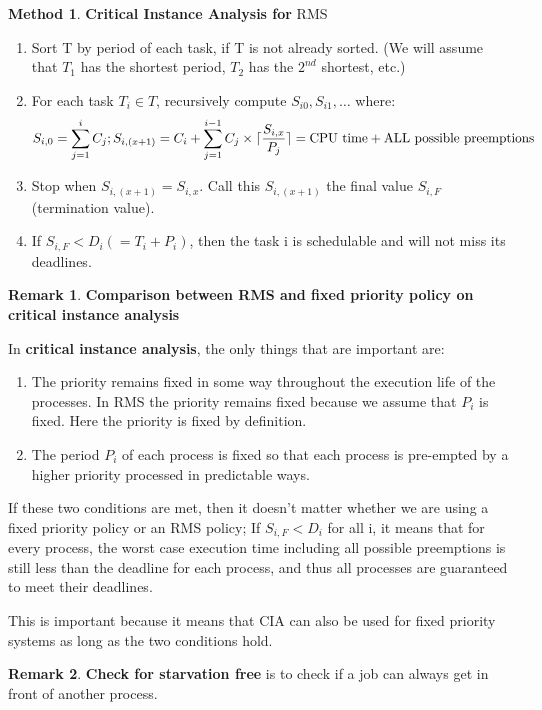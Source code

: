 \documentclass[11pt,a4paper]{article}
\theoremstyle{definition}
\newtheorem*{remark}{Remark}
\newtheorem{method}{Method}[section]
\DeclarePairedDelimiter\ceil{\lceil}{\rceil}
\newenvironment{myenumerate}
{ \begin{enumerate}
    \setlength{\itemsep}{5pt}
    \setlength{\parskip}{0pt}
    \setlength{\parsep}{0pt}     }
{ \end{enumerate}                }
\begin{document}
\begin{method}{\textbf{Critical Instance Analysis for} \textsf{RMS}}
	\begin{myenumerate}
		\item Sort T by period of each task, if T is not already sorted. (We will assume that $T_1$ has the shortest period, $T_2$ has the $2^{nd}$ shortest, etc.)
		\item For each task $T_i \in T$, recursively compute $S_{i0}, S_{i1}, \dots$ where:
		\[ S_{i,0}=\sum^i_{j=1}C_j; S_{i,(x+1)}=C_i+\sum^{i-1}_{j=1}C_j\times \ceil{\frac{S_{i,x}}{P_j}} =\text{CPU time}+\text{ALL possible preemptions} \]
		\item Stop when $S_{i,(x+1)}=S_{i,x}$. Call this $S_{i,(x+1)}$ the final value $S_{i,F}$ (termination value).
		\item If $S_{i,F}<D_i (=T_i+P_i)$, then the task i is schedulable and will not miss its deadlines.
	\end{myenumerate}
\end{method}
\begin{remark}{\textbf{Comparison between RMS and fixed priority policy on critical instance analysis}}

	In \textbf{critical instance analysis}, the only things that are important are:
	\begin{myenumerate}
		\item The priority remains fixed in some way throughout the execution life of the processes. In RMS the priority remains fixed because we assume that $P_i$ is fixed. Here the priority is fixed by definition.
		\item The period $P_i$ of each process is fixed so that each process is pre-empted by a higher priority processed in predictable ways.
	\end{myenumerate}
	
	If these two conditions are met, then it doesn’t matter whether we are using a fixed priority policy or an RMS policy; If $S_{i, F} < D_i$ for all i, it means that for every process, the worst case execution time including all possible preemptions is still less than the deadline for each process, and thus all processes are guaranteed to meet their deadlines.
	
	This is important because it means that CIA can also be used for fixed priority systems as long as the two conditions hold.
\end{remark}

\begin{remark}{\textbf{Check for starvation free}}
	is to check if a job can always get in front of another process.
\end{remark}
\end{document}
